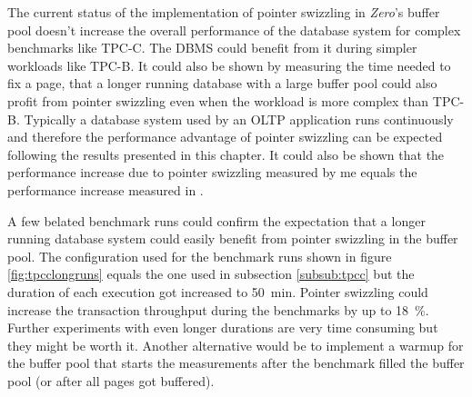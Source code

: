 	The current status of the implementation of pointer swizzling in \emph{Zero}'s buffer pool doesn't increase the overall performance of the database system for complex benchmarks like TPC-C. The DBMS could benefit from it during simpler workloads like TPC-B. It could also be shown by measuring the time needed to fix a page, that a longer running database with a large buffer pool could also profit from pointer swizzling even when the workload is more complex than TPC-B. Typically a database system used by an OLTP application runs continuously and therefore the performance advantage of pointer swizzling can be expected following the results presented in this chapter. It could also be shown that the performance increase due to pointer swizzling measured by me equals the performance increase measured in \cite{Graefe:2014}.
	
	A few belated benchmark runs could confirm the expectation that a longer running database system could easily benefit from pointer swizzling in the buffer pool. The configuration used for the benchmark runs shown in figure \ref{fig:tpcclongruns} equals the one used in subsection \ref{subsub:tpcc} but the duration of each execution got increased to \SI{50}{\minute}. Pointer swizzling could increase the transaction throughput during the benchmarks by up to \SI{18}{\percent}. Further experiments with even longer durations are very time consuming but they might be worth it. Another alternative would be to implement a warmup for the buffer pool that starts the measurements after the benchmark filled the buffer pool (or after all pages got buffered).

